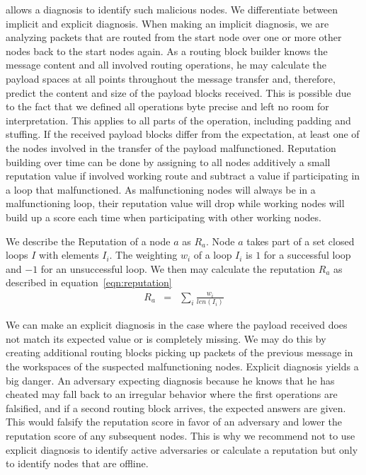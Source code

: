 \MessageVortex{} allows a diagnosis to identify such malicious nodes. We differentiate between implicit and explicit diagnosis. When making an implicit diagnosis, we are analyzing packets that are routed from the start node over one or more other nodes back to the start nodes again. As a routing block builder knows the message content and all involved routing operations, he may calculate the payload spaces at all points throughout the message transfer and, therefore, predict the content and size of the payload blocks received. This is possible due to the fact that we defined all operations byte precise and left no room for interpretation. This applies to all parts of the operation, including padding and stuffing. If the received payload blocks differ from the expectation, at least one of the nodes involved in the transfer of the payload malfunctioned. Reputation building over time can be done by assigning to all nodes additively a small reputation value if involved working route and subtract a value if participating in a loop that malfunctioned. As malfunctioning nodes will always be in a malfunctioning loop, their reputation value will drop while working nodes will build up a score each time when participating with other working nodes.

We describe the Reputation of a node $a$ as $R_a$. Node $a$ takes part of a set closed loops $I$ with elements $I_i$. The weighting $w_i$ of a loop $I_i$ is $1$ for a successful loop and $-1$ for an unsuccessful loop. We then may calculate the reputation $R_a$ as described in equation~\ref{eqn:reputation}
\begin{eqnarray}
	R_a & = & \sum_{i}{\frac{w_i}{len\left(I_i\right)}}\label{eqn:reputation}
\end{eqnarray} 

We can make an explicit diagnosis in the case where the payload received does not match its expected value or is completely missing. We may do this by creating additional routing blocks picking up packets of the previous message in the workspaces of the suspected malfunctioning nodes. Explicit diagnosis yields a big danger. An adversary expecting diagnosis because he knows that he has cheated may fall back to an irregular behavior where the first operations are falsified, and if a second routing block arrives, the expected answers are given. This would falsify the reputation score in favor of an adversary and lower the reputation score of any subsequent nodes. This is why we recommend not to use explicit diagnosis to identify active adversaries or calculate a reputation but only to identify nodes that are offline.

